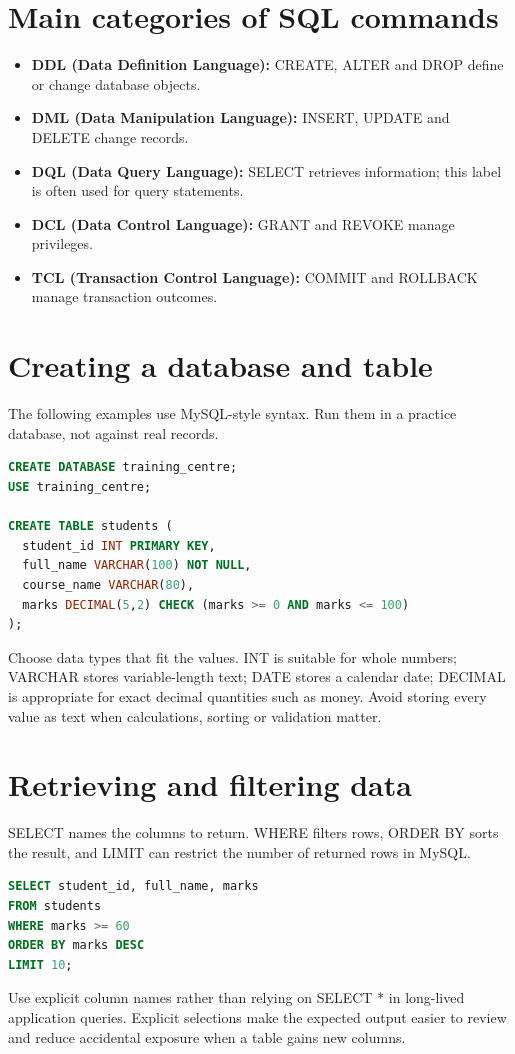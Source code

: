 \documentclass[11pt,openany,oneside]{book}
\begin{document}
\section{Main categories of SQL commands}
\begin{itemize}
\item \textbf{DDL (Data Definition Language):} CREATE, ALTER and DROP define or change database objects.
\item \textbf{DML (Data Manipulation Language):} INSERT, UPDATE and DELETE change records.
\item \textbf{DQL (Data Query Language):} SELECT retrieves information; this label is often used for query statements.
\item \textbf{DCL (Data Control Language):} GRANT and REVOKE manage privileges.
\item \textbf{TCL (Transaction Control Language):} COMMIT and ROLLBACK manage transaction outcomes.
\end{itemize}

\section{Creating a database and table}
The following examples use MySQL-style syntax. Run them in a practice database, not against real records.

\begin{lstlisting}[style=webcode,language=SQL]
CREATE DATABASE training_centre;
USE training_centre;

CREATE TABLE students (
  student_id INT PRIMARY KEY,
  full_name VARCHAR(100) NOT NULL,
  course_name VARCHAR(80),
  marks DECIMAL(5,2) CHECK (marks >= 0 AND marks <= 100)
);
\end{lstlisting}
Choose data types that fit the values. INT is suitable for whole numbers; VARCHAR stores variable-length text; DATE stores a calendar date; DECIMAL is appropriate for exact decimal quantities such as money. Avoid storing every value as text when calculations, sorting or validation matter.

\section{Retrieving and filtering data}
SELECT names the columns to return. WHERE filters rows, ORDER BY sorts the result, and LIMIT can restrict the number of returned rows in MySQL.

\begin{lstlisting}[style=webcode,language=SQL]
SELECT student_id, full_name, marks
FROM students
WHERE marks >= 60
ORDER BY marks DESC
LIMIT 10;
\end{lstlisting}
Use explicit column names rather than relying on SELECT * in long-lived application queries. Explicit selections make the expected output easier to review and reduce accidental exposure when a table gains new columns.
\end{document}
